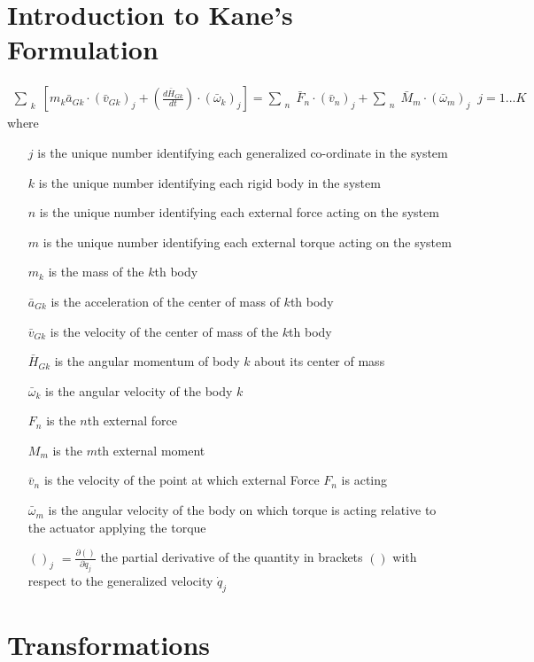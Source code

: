 \documentclass[a4paper,10pt]{article}
\begin{document}
\section{Introduction to Kane's Formulation}
\begin{align}
 \sum_{\substack{k}} \left[ m_k \bar{a}_{Gk} \cdot \left(\bar{v}_{Gk}\right)_j + \left( \frac{d\bar{H}_{Gk}}{dt} 
 \right) \cdot \left( \bar\omega_k \right)_j \right] = \sum_{\substack{n}}  \bar{F}_n \cdot \left( \bar{v}_n \right)_j 
 + \sum_{\substack{n}}  \bar{M}_m \cdot \left( \bar{\omega}_m \right)_j \;\; j=1 ... K \label{kanes}
\end{align}
where 
\begin{itemize}[label={}]
\item[$j$] is the unique number identifying each generalized co-ordinate in the system
\item[$k$] is the unique number identifying each rigid body in the system
\item[$n$] is the unique number identifying each external force acting on the system
\item[$m$] is the unique number identifying each external torque acting on the system
\item[$m_k$] is the mass of the $k$th body
\item[$\bar{a}_{Gk}$] is the acceleration of the center of mass of $k$th body
\item[$\bar{v}_{Gk}$] is the velocity of the center of mass of the $k$th body
\item[$\bar{H}_{Gk}$] is the angular momentum of body $k$ about its center of mass
\item[$\bar{\omega}_{k}$] is the angular velocity of the body $k$
\item[$F_n$] is the $n$th external force
\item[$M_m$] is the $m$th external moment
\item[$\bar{v}_{n}$] is the velocity of the point at which external Force $F_n$ is acting
\item[$\bar{\omega}_{m}$] is the angular velocity of the body on which torque is acting relative to the actuator applying the torque
\item[$()_j$] $=\frac{\partial ()}{\partial \dot{q}_j}$ the partial derivative of the quantity in brackets $()$ with respect to the generalized
velocity $\dot{q}_j$
\end{itemize}

\section{Transformations}
\end{document}
